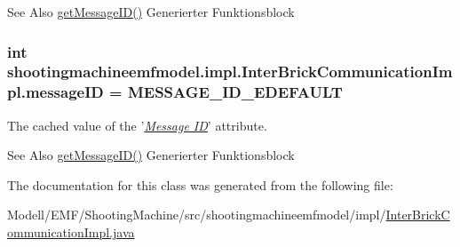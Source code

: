 \begin{DoxySeeAlso}{See Also}
\hyperlink{classshootingmachineemfmodel_1_1impl_1_1_inter_brick_communication_impl_ace5e994ef218bf1074d002ebaef563b0}{get\-Message\-I\-D()} Generierter Funktionsblock  
\end{DoxySeeAlso}
\hypertarget{classshootingmachineemfmodel_1_1impl_1_1_inter_brick_communication_impl_a2b87fd3de3c67ba80aafb38cb48fd455}{
\subsubsection[{message\-I\-D}]{\setlength{\rightskip}{0pt plus 5cm}int shootingmachineemfmodel.\-impl.\-Inter\-Brick\-Communication\-Impl.\-message\-I\-D = {\bf M\-E\-S\-S\-A\-G\-E\-\_\-\-I\-D\-\_\-\-E\-D\-E\-F\-A\-U\-L\-T}\hspace{0.3cm}{\ttfamily [protected]}}}\label{classshootingmachineemfmodel_1_1impl_1_1_inter_brick_communication_impl_a2b87fd3de3c67ba80aafb38cb48fd455}
The cached value of the '\hyperlink{classshootingmachineemfmodel_1_1impl_1_1_inter_brick_communication_impl_ace5e994ef218bf1074d002ebaef563b0}{{\itshape Message I\-D}}' attribute.

\begin{DoxySeeAlso}{See Also}
\hyperlink{classshootingmachineemfmodel_1_1impl_1_1_inter_brick_communication_impl_ace5e994ef218bf1074d002ebaef563b0}{get\-Message\-I\-D()} Generierter Funktionsblock  
\end{DoxySeeAlso}


The documentation for this class was generated from the following file\-:\begin{DoxyCompactItemize}
\item 
Modell/\-E\-M\-F/\-Shooting\-Machine/src/shootingmachineemfmodel/impl/\hyperlink{_inter_brick_communication_impl_8java}{Inter\-Brick\-Communication\-Impl.\-java}\end{DoxyCompactItemize}
